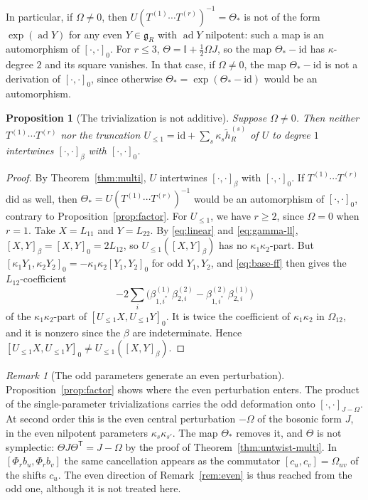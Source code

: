 \documentclass[11pt]{article}
\numberwithin{equation}{section}
\newtheorem{proposition}[theorem]{Proposition}
\theoremstyle{definition}
\theoremstyle{remark}
\newtheorem{remark}[theorem]{Remark}
\newcommand{\ad}{\operatorname{ad}}
\begin{document}
In particular, if $\Omega\neq0$, then $U(T^{(1)}\cdots T^{(r)})^{-1}=\Theta_*$ is not of the
form $\exp(\ad Y)$ for any even $Y\in\mathfrak g_R$ with $\ad Y$ nilpotent: such a map is an automorphism of $[\cdot,\cdot]_0$. For $r\leq3$, $\Theta=\mathbb I+\tfrac12\Omega J$, so the map $\Theta_*-\mathrm{id}$ has $\kappa$-degree $2$ and its square
vanishes. In that case, if $\Omega\neq0$, the map $\Theta_*-\mathrm{id}$ is not a derivation of $[\cdot,\cdot]_0$, since otherwise
$\Theta_*=\exp(\Theta_*-\mathrm{id})$ would be an automorphism.

\begin{proposition}[The trivialization is not additive]\label{prop:not-additive}
Suppose $\Omega\neq0$. Then neither $T^{(1)}\cdots T^{(r)}$ nor the truncation
$U_{\le1}=\mathrm{id}+\sum_s\kappa_s\tilde h^{(s)}_R$ of $U$ to degree $1$ intertwines
$[\cdot,\cdot]_\beta$ with $[\cdot,\cdot]_0$.
\end{proposition}

\begin{proof}
By Theorem~\ref{thm:multi}, $U$ intertwines $[\cdot,\cdot]_\beta$ with $[\cdot,\cdot]_0$. If
$T^{(1)}\cdots T^{(r)}$ did as well, then $\Theta_*=U(T^{(1)}\cdots T^{(r)})^{-1}$ would be an
automorphism of $[\cdot,\cdot]_0$, contrary to Proposition~\ref{prop:factor}. For $U_{\le1}$, we have
$r\geq2$, since $\Omega=0$ when $r=1$. Take $X=L_{11}$ and $Y=L_{22}$. By
\eqref{eq:linear} and \eqref{eq:gamma-ll}, $[X,Y]_\beta=[X,Y]_0=2L_{12}$, so $U_{\le1}([X,Y]_\beta)$ has
no $\kappa_1\kappa_2$-part. But $[\kappa_1Y_1,\kappa_2Y_2]_0=-\kappa_1\kappa_2[Y_1,Y_2]_0$ for odd $Y_1,Y_2$, and
\eqref{eq:base-ff} then gives the $L_{12}$-coefficient
\[
 -2\sum_i\bigl(\beta^{(1)}_{1,i^*}\beta^{(2)}_{2,i}-\beta^{(2)}_{1,i^*}\beta^{(1)}_{2,i}\bigr)
\]
of the $\kappa_1\kappa_2$-part of $[U_{\le1}X,U_{\le1}Y]_0$. It is twice the coefficient of $\kappa_1\kappa_2$ in $\Omega_{12}$,
and it is nonzero since the $\beta$ are indeterminate. Hence $[U_{\le1}X,U_{\le1}Y]_0\neq U_{\le1}([X,Y]_\beta)$.
\end{proof}

\begin{remark}[The odd parameters generate an even perturbation]\label{rem:even-generated}
Proposition~\ref{prop:factor} shows where the even perturbation enters. The product of the
single-parameter trivializations carries the odd deformation onto $[\cdot,\cdot]_{J-\Omega}$. At
second order this is the even central perturbation $-\Omega$ of the bosonic form $J$, in the
even nilpotent parameters $\kappa_s\kappa_{s'}$. The map $\Theta_*$ removes it, and $\Theta$ is not symplectic:
$\Theta J\Theta^{\mathsf T}=J-\Omega$ by the proof of Theorem~\ref{thm:untwist-multi}. In
$[\Phi_rb_u,\Phi_rb_v]$ the same cancellation appears as the commutator $[c_u,c_v]=\Omega_{uv}$
of the shifts $c_u$. The even direction of Remark~\ref{rem:even} is thus reached from the odd
one, although it is not treated here.
\end{remark}
\end{document}
